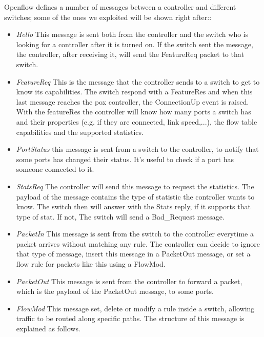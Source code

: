 \documentclass[article,10pt]{IEEEtran}
\begin{document}
Openflow defines a number of messages between a controller and different switches; some of the ones we exploited will be shown right after:\cite{openflow}:
\begin{itemize}

\item \emph{Hello} \newline This message is sent both from the controller and the switch who is looking for a controller after it
	is turned on. If the switch sent the message, the controller, after receiving it, will send the FeatureReq packet to that switch.
\item \emph{FeatureReq} \newline This is the message that the controller sends to a switch to get to know its capabilities. The switch
	respond with a FeatureRes and when this last message reaches the pox controller, the ConnectionUp event is raised.
	With the featureRes the controller will know how many ports a switch has and their properties (e.g. if they are connected, link speed,...), the flow table capabilities and the supported statistics.
\item \emph{PortStatus} \newline this message is sent from a switch to the controller, to notify that some ports has changed their status.
		It's useful to check if a port has someone connected to it.
\item \emph{StatsReq} \newline The controller will send this message to request the statistics. The payload of the message contains the type of 
statistic the controller wants to know.
		The switch then will answer with the Stats reply, if it supports that type of stat. If not, The switch will send a Bad_Request
		message.
\item \emph{PacketIn} \newline This message is sent from the switch to the controller everytime a packet arrives without matching any rule.
The controller can decide to ignore that type of message, insert this message in a PacketOut message, or set
		a flow rule for packets like this using a FlowMod.
\item \emph{PacketOut} \newline This message is sent from the controller to forward a packet, which is the payload of the PacketOut message,
to some ports.
\item \emph{FlowMod} \newline This message set, delete or modify a rule inside a switch, allowing traffic to be routed along specific paths. The structure of this message is explained as follows.
\\
\end{itemize}
\end{document}
